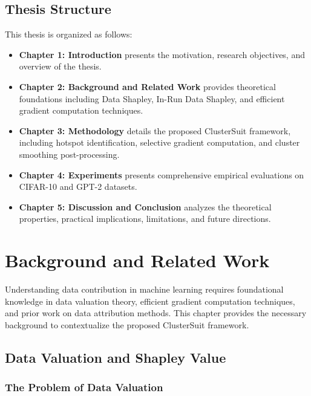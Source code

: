 \documentclass[12pt,a4paper]{report}
\begin{document}
\section{Thesis Structure}
\label{sec:structure}

This thesis is organized as follows:

\begin{itemize}
    \item \textbf{Chapter 1: Introduction} presents the motivation, research objectives, and overview of the thesis.
    
    \item \textbf{Chapter 2: Background and Related Work} provides theoretical foundations including Data Shapley, In-Run Data Shapley, and efficient gradient computation techniques.
    
    \item \textbf{Chapter 3: Methodology} details the proposed ClusterSuit framework, including hotspot identification, selective gradient computation, and cluster smoothing post-processing.
    
    \item \textbf{Chapter 4: Experiments} presents comprehensive empirical evaluations on CIFAR-10 and GPT-2 datasets.
    
    \item \textbf{Chapter 5: Discussion and Conclusion} analyzes the theoretical properties, practical implications, limitations, and future directions.
\end{itemize}

\chapter{Background and Related Work}
\label{chap:background}

Understanding data contribution in machine learning requires foundational knowledge in data valuation theory, efficient gradient computation techniques, and prior work on data attribution methods. This chapter provides the necessary background to contextualize the proposed ClusterSuit framework.

\section{Data Valuation and Shapley Value}
\label{sec:shapley}

\subsection{The Problem of Data Valuation}
\label{sec:data_valuation_problem}
\end{document}
